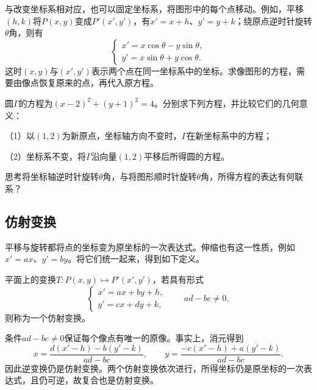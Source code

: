 与改变坐标系相对应，也可以固定坐标系，将图形中的每个点移动。例如，平移\((h,k)\)将\(P(x,y)\)变成\(P'(x',y')\)，有\(x'=x+h\)、\(y'=y+k\)；绕原点逆时针旋转\(\theta\)角，则有
\begin{equation}\label{eq:quadratic-point-rotation}
    \begin{cases}
        x'=x\cos\theta-y\sin\theta ,\\
        y'=x\sin\theta+y\cos\theta .
    \end{cases}
\end{equation}
这时\((x,y)\)与\((x',y')\)表示两个点在同一坐标系中的坐标。求像图形的方程，需要由像点恢复原来的点，再代入原方程。

\begin{example}\label{ex:quadratic-translation-distinction}
圆\(\Gamma\)的方程为\((x-2)^2+(y+1)^2=4\)。分别求下列方程，并比较它们的几何意义：

（1）以\((1,2)\)为新原点，坐标轴方向不变时，\(\Gamma\)在新坐标系中的方程；

（2）坐标系不变，将\(\Gamma\)沿向量\((1,2)\)平移后所得圆的方程。
\end{example}

{\kaiti{}思考\quad 将坐标轴逆时针旋转\(\theta\)角，与将图形顺时针旋转\(\theta\)角，所得方程的表达有何联系？}

\subsection{仿射变换}
\label{subsec:quadratic-affine-transformations}

平移与旋转都将点的坐标变为原坐标的一次表达式。伸缩也有这一性质，例如\(x'=ax\)、\(y'=by\)。将它们统一起来，得到如下定义。

\begin{definition}\label{def:quadratic-affine-transformation}
平面上的变换\(T:P(x,y)\longmapsto P'(x',y')\)，若具有形式
\begin{equation}\label{eq:quadratic-affine-map}
    \begin{cases}
        x'=ax+by+h ,\\
        y'=cx+dy+k ,
    \end{cases}
    \qquad ad-bc\ne0 ,
\end{equation}
则称为一个{\heiti{}仿射变换}。
\end{definition}

条件\(ad-bc\ne0\)保证每个像点有唯一的原像。事实上，消元得到
\begin{equation}\label{eq:quadratic-affine-inverse}
    x=\frac{d(x'-h)-b(y'-k)}{ad-bc} , \qquad
    y=\frac{-c(x'-h)+a(y'-k)}{ad-bc} .
\end{equation}
因此逆变换仍是仿射变换。两个仿射变换依次进行，所得坐标仍是原坐标的一次表达式，且仍可逆，故复合也是仿射变换。

